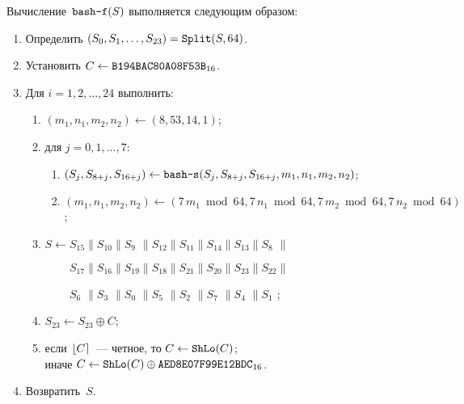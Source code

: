 Вычисление~$\texttt{bash-f}(S)$ выполняется следующим образом:
\begin{enumerate}
\item
Определить  
$(S_0,S_1,\ldots,S_{23})=\mathop{\texttt{Split}}\nolimits(S, 64)$.

\item
Установить 
$C\leftarrow\texttt{B194BAC80A08F53B}_{16}$.

\item
Для $i=1,2,\ldots,24$ выполнить:
\begin{enumerate}
\item
$(m_1,n_1,m_2,n_2)\leftarrow (8,53,14,1)$;
\item
для $j=0,1,\ldots,7$:
\begin{enumerate}
\item
$(S_j,S_{8+j},S_{16+j})\leftarrow
\texttt{bash-s}(S_j,S_{8+j},S_{16+j},m_1,n_1,m_2,n_2)$;
\item
$(m_1,n_1,m_2,n_2)\leftarrow 
(7\,m_1\bmod 64,7\,n_1\bmod 64,7\,m_2\bmod 64,7\,n_2\bmod 64)$;
\end{enumerate}
\item
$S\leftarrow  S_{15}\parallel 
              S_{10}\parallel 
              S_{9\phantom{0}}\parallel  
              S_{12}\parallel 
              S_{11}\parallel 
              S_{14}\parallel 
              S_{13}\parallel 
              S_{8\phantom{0}}\parallel$\par
\hspace{24pt}$\phantom{S\leftarrow} 
              S_{17}\parallel 
              S_{16}\parallel 
              S_{19}\parallel 
              S_{18}\parallel 
              S_{21}\parallel 
              S_{20}\parallel 
              S_{23}\parallel 
              S_{22}\parallel$\par
\hspace{24pt}$\phantom{S\leftarrow} 
              S_{6\phantom{0}}\parallel 
              S_{3\phantom{0}}\parallel  
              S_{0\phantom{0}}\parallel  
              S_{5\phantom{0}}\parallel 
              S_{2\phantom{0}}\parallel 
              S_{7\phantom{0}}\parallel  
              S_{4\phantom{0}}\parallel  
              S_{1\phantom{0}}$;
\item
$S_{23}\leftarrow S_{23}\oplus C$;
\item
если $\lfloor C\rceil$~--- четное,
то $C\leftarrow\mathop{\texttt{ShLo}}\nolimits(C)$;\\
иначе $C\leftarrow\mathop{\texttt{ShLo}}\nolimits(C)\oplus\texttt{AED8E07F99E12BDC}_{16}$.
\end{enumerate}
\item
Возвратить~$S$.
\end{enumerate}